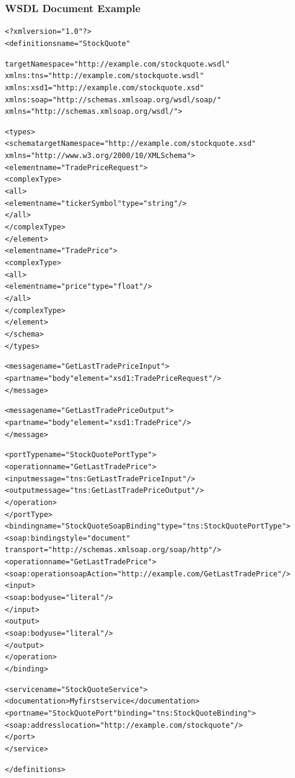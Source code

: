 \documentclass{note}
\begin{document}
\subsubsection{WSDL Document Example}
\begin{alltt}
<?xml version="1.0"?>
<definitions name="StockQuote"

targetNamespace="http://example.com/stockquote.wsdl"
          xmlns:tns="http://example.com/stockquote.wsdl"
          xmlns:xsd1="http://example.com/stockquote.xsd"
          xmlns:soap="http://schemas.xmlsoap.org/wsdl/soap/"
          xmlns="http://schemas.xmlsoap.org/wsdl/">

    <types>
       <schema targetNamespace="http://example.com/stockquote.xsd"
              xmlns="http://www.w3.org/2000/10/XMLSchema">
           <element name="TradePriceRequest">
              <complexType>
                  <all>
                      <element name="tickerSymbol" type="string"/>
                  </all>
              </complexType>
           </element>
           <element name="TradePrice">
              <complexType>
                  <all>
                      <element name="price" type="float"/>
                  </all>
              </complexType>
           </element>
       </schema>
    </types>

    <message name="GetLastTradePriceInput">
        <part name="body" element="xsd1:TradePriceRequest"/>
    </message>

    <message name="GetLastTradePriceOutput">
        <part name="body" element="xsd1:TradePrice"/>
    </message>

    <portType name="StockQuotePortType">
        <operation name="GetLastTradePrice">
           <input message="tns:GetLastTradePriceInput"/>
           <output message="tns:GetLastTradePriceOutput"/>
        </operation>
    </portType>
    <binding name="StockQuoteSoapBinding" type="tns:StockQuotePortType">
        <soap:binding style="document" 
                      transport="http://schemas.xmlsoap.org/soap/http"/>
        <operation name="GetLastTradePrice">
           <soap:operation soapAction="http://example.com/GetLastTradePrice"/>
           <input>
               <soap:body use="literal"/>
           </input>
           <output>
               <soap:body use="literal"/>
           </output>
        </operation>
    </binding>

    <service name="StockQuoteService">
        <documentation>My first service</documentation>
        <port name="StockQuotePort" binding="tns:StockQuoteBinding">
           <soap:address location="http://example.com/stockquote"/>
        </port>
    </service>

</definitions>
\end{alltt}
\end{document}

